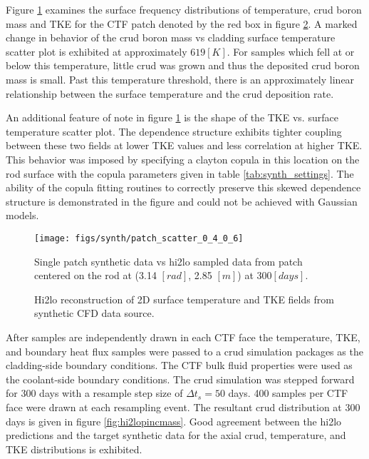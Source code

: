 Figure \ref{fig:patchscatter} examines the surface frequency distributions of temperature, crud boron mass and TKE for the CTF patch denoted by the red box in figure \ref{fig:hi2lo_tke_t}.  A marked change in behavior of the crud boron mass vs cladding surface temperature scatter plot is exhibited at approximately $ 619[K]$.  For samples which fell at or below this temperature, little crud was grown and thus the deposited crud boron mass is small.  Past this temperature threshold, there is an approximately linear relationship between the surface temperature and the crud deposition rate.  

An additional feature of note in figure  \ref{fig:patchscatter} is the shape of the TKE vs. surface temperature scatter plot.  The dependence structure exhibits tighter coupling between these two fields at lower TKE values and less correlation at higher TKE.  This behavior was imposed by specifying a clayton copula in this location on the rod surface with the copula parameters given in table \ref{tab:synth_settings}.  The ability of the copula fitting routines to correctly preserve this skewed dependence structure is demonstrated in the figure and could not be achieved with Gaussian models.

\begin{figure}[H]
    \centering
    \texttt{[image: figs/synth/patch\_scatter\_0\_4\_0\_6]}
    \caption[Single patch synthetic CFD data vs hi2lo sampled data.]{Single patch synthetic data vs hi2lo sampled data from patch centered on the rod at (3.14 $[rad]$, 2.85 $[m]$) at 300$[days]$.}
    \label{fig:patchscatter}
\end{figure}

\begin{figure}[H]%
    \centering
    \qquad
    \caption{Hi2lo reconstruction of 2D surface temperature and TKE fields from synthetic CFD data source. }%
    \label{fig:hi2lo_tke_t}%
\end{figure}


After samples are independently drawn in each CTF face the temperature, TKE, and boundary heat flux samples were passed to a crud simulation packages as the cladding-side boundary conditions.  The CTF bulk fluid properties were used as the coolant-side boundary conditions.  The crud simulation was stepped forward for 300 days with a resample step size of $\Delta t_s =50$ days.  400 samples per CTF face were drawn at each resampling event. The resultant crud distribution at 300 days is given in figure \ref{fig:hi2lopincmass}.  Good agreement between the hi2lo predictions and the target synthetic data for the axial crud, temperature, and TKE distributions is exhibited.

